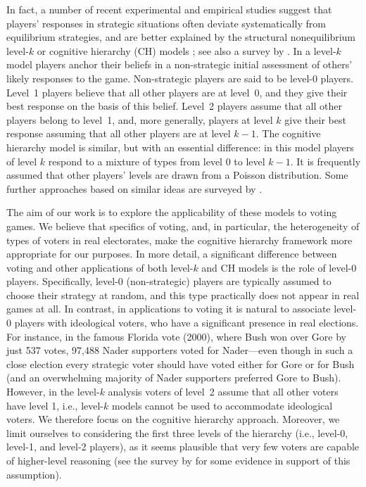 \documentclass[11pt]{article}
\begin{document}
In fact, a number of recent experimental and empirical studies suggest that players' responses in strategic 
situations often deviate systematically from equilibrium strategies, and are better explained by the structural nonequilibrium 
level-$k$ \citep{nagel1995unraveling,stahl1994experimental} or cognitive hierarchy (CH) models 
\citep{camerer2004cognitive}; see also a survey by \cite{crawford2013structural}. 
In a level-$k$ model players anchor their 
beliefs in a non-strategic initial assessment of others' likely responses to the game.
Non-strategic players are said to be level-0 players. 
Level~1 players believe that all other players are at level~0, 
and they give their best response on the basis of this belief. 
Level~2 players assume that all other players belong to level~1, and, more generally, 
players at level $k$ give their best response assuming that all other players are at level $k-1$. 
The cognitive hierarchy model is similar, but with an essential difference: 
in this model players of level $k$ respond to a mixture of types from level $0$ to level $k-1$. 
It is frequently assumed that other players' levels are drawn from a Poisson distribution. 
Some further approaches based on similar ideas are surveyed by \citet{aaai/WrightL10}. 

The aim of our work is to explore the applicability of these models to voting games.
We believe that specifics of voting, and, in particular, the heterogeneity of types
of voters in real electorates, make the cognitive hierarchy framework more appropriate 
for our purposes. In more detail, a significant difference between voting and other applications 
of both level-$k$ and CH models is the role of level-0 players. Specifically,  
level-0 (non-strategic) players are typically assumed to choose their strategy at random, 
and this type practically does not appear in real games at all. 
In contrast, in applications to voting it is natural to associate level-0 players 
with ideological voters, who have a significant presence in real elections. 
For instance, in the famous Florida vote (2000), where Bush won over Gore by just 537 votes,  
97,488 Nader supporters voted for Nader---even though in such a close election every strategic voter 
should have voted either for Gore or for Bush (and an overwhelming majority of Nader supporters 
preferred Gore to Bush). However, in the level-$k$ analysis voters of level~2 assume 
that all other voters have level 1, i.e., level-$k$ models cannot be used
to accommodate ideological voters. We therefore focus on the cognitive hierarchy approach.
Moreover, we limit ourselves to considering the first three levels of the hierarchy
(i.e., level-0, level-1, and level-2 players), as it seems plausible that very few voters
are capable of higher-level reasoning (see the survey by \citet{crawford2013structural}
for some evidence in support of this assumption). 
\end{document}
